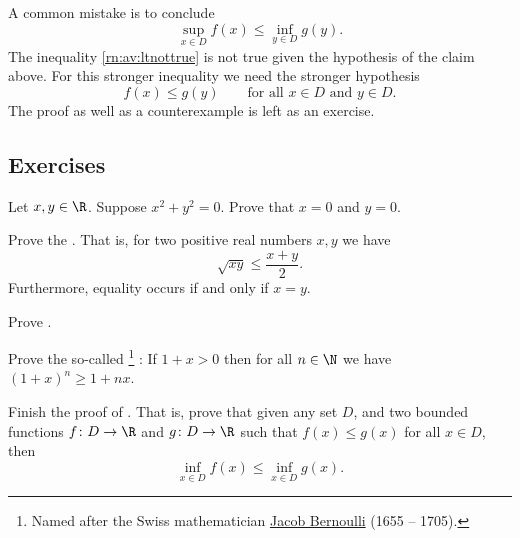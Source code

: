 \documentclass[12pt]{book}
\begin{document}
\medskip

A common mistake is to conclude 
\begin{equation} \label{rn:av:ltnottrue}
\sup_{x \in D} f(x) \leq \inf_{y \in D} g(y) .
\end{equation}
The inequality \eqref{rn:av:ltnottrue} is not true given the hypothesis of the claim above.
For this stronger
inequality we need the stronger hypothesis
\begin{equation*}
f(x) \leq g(y) \qquad \text{for all $x \in D$ and $y \in D$.}
\end{equation*}
The proof as well as a counterexample is left as an exercise.

\subsection*{Exercises}

\begin{exercise}
Let $x, y \in \R$.  
Suppose $x^2 + y^2 = 0$.  
Prove that $x = 0$ and $y = 0$.
\end{exercise}

\begin{exercise}
Prove the \emph{}.  That is, 
for two positive real numbers $x,y$ we have
\begin{equation*}
\sqrt{xy} \leq \frac{x+y}{2} .
\end{equation*}
Furthermore, equality occurs if and only if $x=y$.
\end{exercise}

\begin{exercise}[Easy]
Prove .
\end{exercise}

\begin{exercise} \label{exercise:bernoulliineq}
Prove the so-called \emph{}%
\footnote{%
Named after the Swiss mathematician
\href{http://en.wikipedia.org/wiki/Jacob_Bernoulli}{Jacob Bernoulli} (1655 --
1705).}%
: If $1+x > 0$ then
for all $n \in \N$ we have $(1+x)^n \geq 1+nx$.
\end{exercise}


\begin{exercise}
Finish the proof of .
That is, prove that
given any set $D$,
and two bounded functions
$f \colon D \to \R$ and $g \colon D \to \R$ 
such that $f(x) \leq g(x)$ for all $x \in D$, then 
\begin{equation*}
\inf_{x\in D} f(x) \leq \inf_{x\in D} g(x) .
\end{equation*}
\end{exercise}
\end{document}
